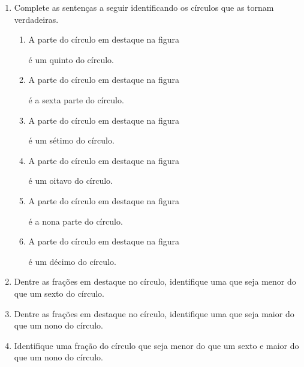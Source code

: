 \begin{atividade}{}
\tikzset{x=1mm,y=1mm}
\begin{enumerate} %
  \item     Complete as sentenças a seguir identificando os círculos que as tornam verdadeiras.
\begin{enumerate} %
      \item        	A parte do círculo em destaque na figura  é um quinto do círculo.
      \item        	A parte do círculo em destaque na figura  é a sexta parte do círculo.
      \item        	A parte do círculo em destaque na figura  é um sétimo do círculo.
      \item        	A parte do círculo em destaque na figura  é um oitavo do círculo.
      \item        	A parte do círculo em destaque na figura  é a nona parte do círculo.
      \item        	A parte do círculo em destaque na figura  é um décimo do círculo.
\end{enumerate} %
  \item     Dentre as frações em destaque no círculo, identifique uma que seja menor do que um sexto do círculo.
  \item     Dentre as frações em destaque no círculo, identifique uma que seja maior do que um nono do círculo.
  \item     Identifique uma fração do círculo que seja menor do que um sexto e maior do que um nono do círculo.
\end{enumerate} %
\end{atividade}

